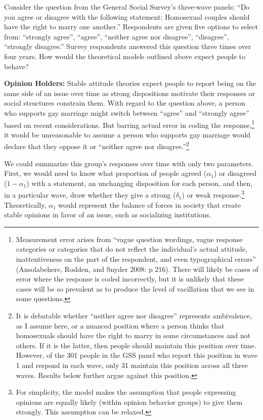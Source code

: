 \documentclass[12pt,]{article}
\begin{document}
Consider the question from the General Social Survey's three-wave panels: ``Do you agree or disagree with the following statement: Homosexual couples should have the right to marry one another.'' Respondents are given five options to select from: ``strongly agree'', ``agree'', ``neither agree nor disagree'', ``disagree'', ``strongly disagree.'' Survey respondents answered this question three times over four years. How would the theoretical models outlined above expect people to behave?

\textbf{Opinion Holders:} Stable attitude theories expect people to report being on the same side of an issue over time as strong dispositions motivate their responses or social structures constrain them. With regard to the question above, a person who supports gay marriage might switch between ``agree'' and ``strongly agree'' based on recent considerations. But barring actual error in coding the response,\footnote{Measurement error arises from ``vague question wordings, vague response categories or categories that do not reflect the individual's actual attitude, inattentiveness on the part of the respondent, and even typographical errors'' (Ansolabehere, Rodden, and Snyder 2008: p 216). There will likely be cases of error where the response is coded incorrectly, but it is unlikely that these cases will be so prevalent as to produce the level of vacillation that we see in some questions.} it would be unreasonable to assume a person who supports gay marriage would declare that they oppose it or ``neither agree nor disagree.''\footnote{It is debatable whether ``neither agree nor disagree'' represents ambivalence, as I assume here, or a nuanced position where a person thinks that homosexuals should have the right to marry in some circumstances and not others. If it is the latter, then people should maintain this position over time. However, of the 301 people in the GSS panel who report this position in wave 1 and respond in each wave, only 31 maintain this position across all three waves. Results below further argue against this position.}

We could summarize this group's responses over time with only two parameters. First, we would need to know what proportion of people agreed (\(\alpha_1\)) or disagreed (\(1-\alpha_1\)) with a statement, an unchanging disposition for each person, and then, in a particular wave, draw whether they give a strong (\(\delta_1\)) or weak response.\footnote{For simplicity, the model makes the assumption that people expressing opinions are equally likely (within opinion behavior groups) to give them strongly. This assumption can be relaxed.} Theoretically, \(\alpha_1\) would represent the balance of forces in society that create stable opinions in favor of an issue, such as socializing institutions.
\end{document}

